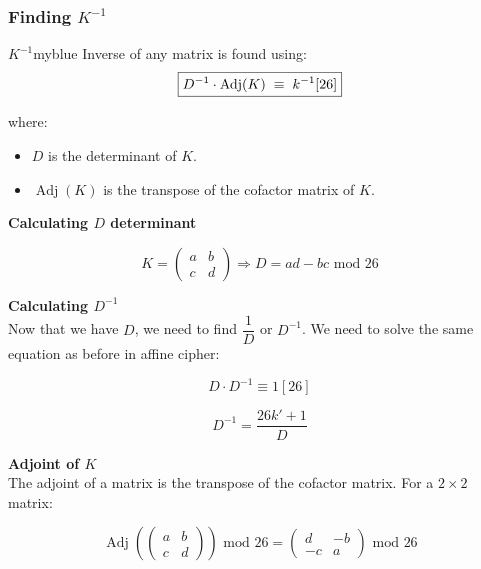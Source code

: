 \subsubsection{Finding \(K^{-1}\)}
\begin{prettyBox}{\(K^{-1}\)}{myblue}
Inverse of any matrix is found using:  
\[
    \boxed{D^{-1} \cdot \operatorname{Adj}(K) \hspace{0.1cm} \equiv \hspace{0.1cm} k^{-1}[26]}
\]

where:  
\begin{itemize}
    \item \(D\) is the determinant of \(K\).
    \item \(\operatorname{Adj}(K)\) is the transpose of the cofactor matrix of \(K\).
\end{itemize}

\vspace{0.4cm}
\textbf{Calculating \(D\) determinant}

\[
K = \begin{pmatrix}
    a & b\\
    c & d
\end{pmatrix}
\Longrightarrow
\boxed{D = ad - bc \text{ mod } 26}
\]

\vspace{0.5cm}

\textbf{Calculating \(D^{-1}\)}\\[0.15cm]
Now that we have \(D\), we need to find \(\dfrac{1}{D}\) or \(D^{-1}\). We need to solve the
same equation as before in affine cipher:

\[
D \cdot D^{-1} \equiv 1 [26]
\]

\[
\boxed{D^{-1} = \frac{26k' + 1 }{D}}
\]

\vspace{0.5cm}
\textbf{Adjoint of \(K\)}\\[0.15cm]
The adjoint of a matrix is the transpose of the cofactor matrix. For a \(2\times2\) matrix:  

\[
\boxed{
\operatorname{Adj} (\begin{pmatrix}
    a & b\\
    c & d
\end{pmatrix}) \text{ mod 26}
= 
\begin{pmatrix}
    d & -b\\
    -c & a
\end{pmatrix}
\text{ mod } 26}
\]
\end{prettyBox}

